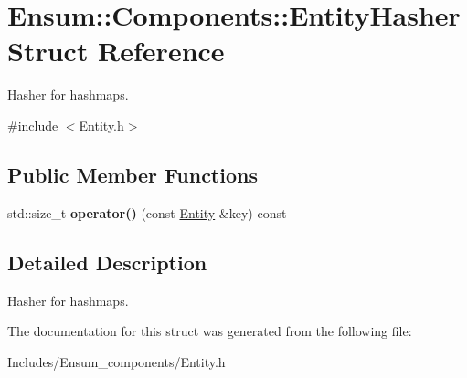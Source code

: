 \hypertarget{struct_ensum_1_1_components_1_1_entity_hasher}{}\section{Ensum\+:\+:Components\+:\+:Entity\+Hasher Struct Reference}
\label{struct_ensum_1_1_components_1_1_entity_hasher}


Hasher for hashmaps.  




{\ttfamily \#include $<$Entity.\+h$>$}

\subsection*{Public Member Functions}
\begin{DoxyCompactItemize}
\item 
std\+::size\+\_\+t {\bfseries operator()} (const \hyperlink{struct_ensum_1_1_components_1_1_entity}{Entity} \&key) const \hypertarget{struct_ensum_1_1_components_1_1_entity_hasher_a9d4b4eb8467c10ad0df24bb12f683c5b}{}\label{struct_ensum_1_1_components_1_1_entity_hasher_a9d4b4eb8467c10ad0df24bb12f683c5b}

\end{DoxyCompactItemize}


\subsection{Detailed Description}
Hasher for hashmaps. 

The documentation for this struct was generated from the following file\+:\begin{DoxyCompactItemize}
\item 
Includes/\+Ensum\+\_\+components/Entity.\+h\end{DoxyCompactItemize}
